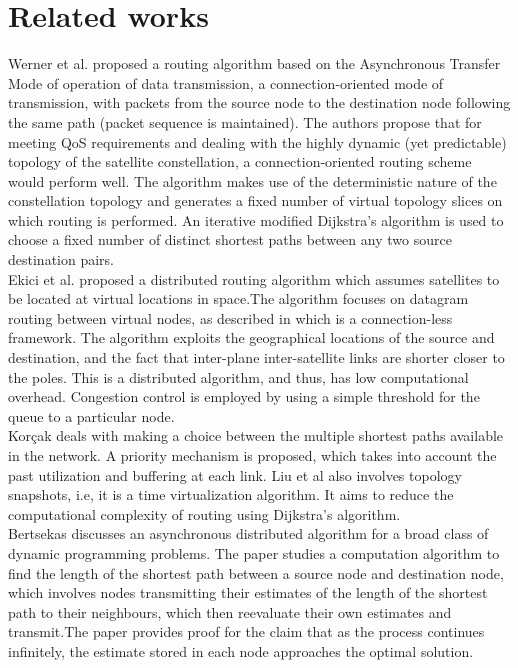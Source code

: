 \documentclass[10pt,conference, final, letterpaper]{IEEEtran}
\begin{document}
\section{Related works}
Werner et al.\cite{atm-based} proposed a routing algorithm based on the Asynchronous Transfer Mode of operation of data transmission, a connection-oriented mode of transmission, with packets from the source node to the destination node following the same path (packet sequence is maintained). The authors propose that for meeting QoS requirements and dealing with the highly dynamic (yet predictable) topology of the satellite constellation, a connection-oriented routing scheme would perform well. The algorithm makes use of the deterministic nature of the constellation topology and generates a fixed number of virtual topology slices on which routing is performed. An iterative modified Dijkstra's algorithm is used to choose a fixed number of distinct shortest paths between any two source destination pairs. \\
Ekici et al.\cite{ekici-datagram}\cite{ekici-dist} proposed a distributed routing algorithm which assumes satellites to be located at virtual locations in space.The algorithm focuses on datagram routing between virtual nodes, as described in \cite{ekici-datagram} which is a connection-less framework. The algorithm exploits the geographical locations of the source and destination, and the fact that inter-plane inter-satellite links are shorter closer to the poles. This is a distributed algorithm, and thus, has low computational overhead. Congestion control is employed by using a simple threshold for the queue to a particular node. \\
Kor\c{c}ak \cite{epar} deals with making a choice between the multiple shortest paths available in the network. A priority mechanism is proposed, which takes into account the past utilization and buffering at each link. 
Liu et al\cite{subopt} also involves topology snapshots, i.e, it is a time virtualization algorithm. It aims to reduce the computational complexity of routing using Dijkstra's algorithm. \\
Bertsekas \cite{bert} discusses an asynchronous distributed algorithm for a broad class of dynamic programming problems. The paper studies a computation algorithm to find the length of the shortest path between a source node and destination node, which involves nodes transmitting their estimates of the length of the shortest path to their neighbours, which then reevaluate their own estimates and transmit.The paper provides proof for the claim that as the process continues infinitely, the estimate stored in each node approaches the optimal solution. \\ 
\end{document}
